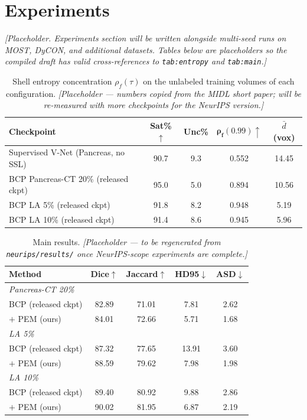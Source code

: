 \section{Experiments}
\label{sec:experiments}

\textit{[Placeholder. Experiments section will be written alongside multi-seed runs on MOST, DyCON, and additional datasets. Tables below are placeholders so the compiled draft has valid cross-references to \texttt{tab:entropy} and \texttt{tab:main}.]}

\begin{table}[t]
\centering
\caption{Shell entropy concentration $\rho_f(\tau)$ on the unlabeled training volumes of each configuration. \emph{[Placeholder — numbers copied from the MIDL short paper; will be re-measured with more checkpoints for the NeurIPS version.]}}
\label{tab:entropy}
\small
\begin{tabular}{lcccc}
\toprule
\textbf{Checkpoint} & \textbf{Sat\%}$\uparrow$ & \textbf{Unc\%} & $\boldsymbol{\rho_f(0.99)}\uparrow$ & $\bar d$ (vox) \\
\midrule
Supervised V-Net (Pancreas, no SSL)   & 90.7 & 9.3 & 0.552 & 14.45 \\
BCP Pancreas-CT 20\% (released ckpt) & 95.0 & 5.0 & 0.894 & 10.56 \\
BCP LA 5\% (released ckpt)           & 91.8 & 8.2 & 0.948 &  5.19 \\
BCP LA 10\% (released ckpt)          & 91.4 & 8.6 & 0.945 &  5.96 \\
\bottomrule
\end{tabular}
\end{table}

\begin{table}[t]
\centering
\caption{Main results. \emph{[Placeholder — to be regenerated from \texttt{neurips/results/} once NeurIPS-scope experiments are complete.]}}
\label{tab:main}
\small
\begin{tabular}{lcccc}
\toprule
\textbf{Method} & \textbf{Dice}$\uparrow$ & \textbf{Jaccard}$\uparrow$ & \textbf{HD95}$\downarrow$ & \textbf{ASD}$\downarrow$ \\
\midrule
\multicolumn{5}{l}{\textit{Pancreas-CT 20\%}} \\
BCP (released ckpt) & 82.89 & 71.01 & 7.81 & 2.62 \\
\;\;$+$ PEM (ours)  & 84.01 & 72.66 & 5.71 & 1.68 \\
\midrule
\multicolumn{5}{l}{\textit{LA 5\%}} \\
BCP (released ckpt) & 87.32 & 77.65 & 13.91 & 3.60 \\
\;\;$+$ PEM (ours)  & 88.59 & 79.62 & 7.98 & 1.98 \\
\midrule
\multicolumn{5}{l}{\textit{LA 10\%}} \\
BCP (released ckpt) & 89.40 & 80.92 & 9.88 & 2.86 \\
\;\;$+$ PEM (ours)  & 90.02 & 81.95 & 6.87 & 2.19 \\
\bottomrule
\end{tabular}
\end{table}
